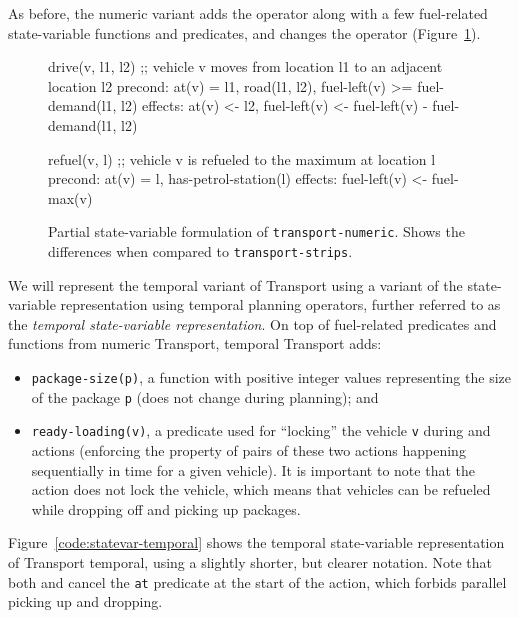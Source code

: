 As before, the numeric variant adds the  operator along with
a few fuel-related state-variable functions and predicates, and changes 
the \drive{} operator (Figure~\ref{code:statevar-numeric}).

\begin{figure}[tb]
\begin{code}
drive(v, l1, l2)
  ;; vehicle v moves from location l1 to an adjacent location l2
  precond: at(v) = l1, road(l1, l2),
           fuel-left(v) >= fuel-demand(l1, l2)
  effects: at(v) <- l2, 
           fuel-left(v) <- fuel-left(v) - fuel-demand(l1, l2)
  
refuel(v, l)
  ;; vehicle v is refueled to the maximum at location l
  precond: at(v) = l, has-petrol-station(l)
  effects: fuel-left(v) <- fuel-max(v)
\end{code}
\caption[Partial state-variable formulation of \texttt{transport-numeric}.]{Partial state-variable formulation of \texttt{transport-numeric}. Shows the  differences when
compared to \texttt{transport-strips}.}
\label{code:statevar-numeric}
\end{figure}

We will represent the temporal variant of Transport using a variant of the state-variable representation using temporal planning operators, further referred to as the \textit{temporal state-variable representation}.
On top of fuel-related predicates and functions from numeric Transport, temporal Transport adds:
\begin{itemize}
\item \verb+package-size(p)+, a function with positive integer values representing the size of the package \verb+p+ (does not change during planning); and
\item \verb+ready-loading(v)+, a predicate used for ``locking'' the vehicle \verb+v+ during \pickup{} and \drop{} actions (enforcing the property of pairs of these two actions happening sequentially in time for a given vehicle). It is important to note that the  action does not
lock the vehicle, which means that vehicles can be refueled while dropping off and picking up packages.
\end{itemize}
Figure~\ref{code:statevar-temporal} shows the temporal state-variable representation of Transport temporal, using a slightly shorter, but clearer notation.
Note that both \pickup{} and \drop{} cancel the \verb+at+ predicate at the start of the action, which forbids parallel picking up and dropping.

